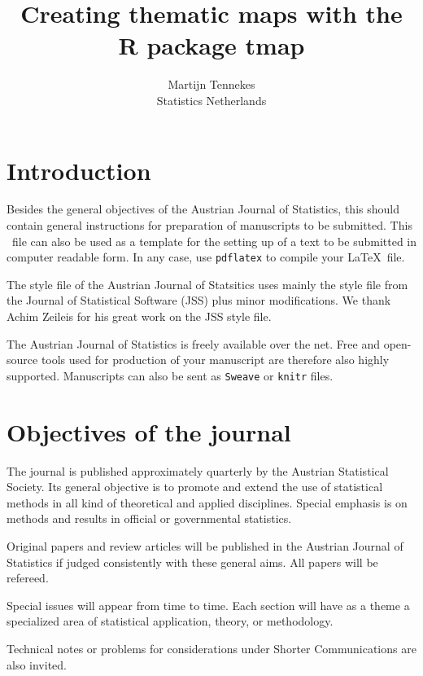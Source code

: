 \documentclass[article]{ajs}
\author{Martijn Tennekes\\ Statistics Netherlands}
\title{Creating thematic maps with the R package tmap}
\begin{document}


\section{Introduction}

Besides the general objectives of the Austrian Journal of
Statistics, this should contain general instructions for
preparation of manuscripts to be submitted. This \LaTeXe\ file can
also be used as a template for the setting up of a text to be
submitted in computer readable form. In any case, use \texttt{pdflatex} to compile your \LaTeX \ file.

The style file of the Austrian Journal of Statsitics uses mainly the style file from the Journal of Statistical Software (JSS) plus minor modifications. We thank Achim Zeileis for his great work on the JSS style file.


The Austrian Journal of Statistics is freely available over the net. Free and open-source tools used for production of your manuscript are therefore also highly supported. Manuscripts can also be sent as \texttt{Sweave} \citep[see, e.g.,][]{leisch02} or \texttt{knitr} \citep{yihui13} files.



\section{Objectives of the journal}

The journal is published approximately quarterly by the Austrian
Statistical Society. Its general objective is to promote and
extend the use of statistical methods in all kind of theoretical
and applied disciplines. Special emphasis is on methods and
results in official or governmental statistics.

Original papers and review articles will be published in the
Austrian Journal of Statistics if judged consistently with these
general aims. All papers will be refereed.

Special issues will appear from time to time. Each
section will have as a theme a specialized area of statistical
application, theory, or methodology.

Technical notes or problems for considerations under Shorter
Communications are also invited.
\end{document}
